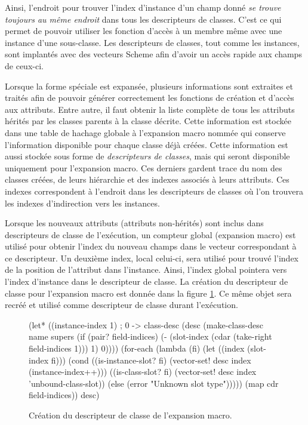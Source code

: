 \documentclass[12pt,oneside,letterpaper,francais]{book}
\newcommand{\scheme}[1]{\selectlanguage{english}{\tt #1}\selectlanguage{french}}
\begin{document}
Ainsi, l'endroit pour trouver l'index d'instance d'un champ donné
\emph{se trouve toujours au même endroit} dans tous les descripteurs
de classes. C'est ce qui permet de pouvoir utiliser les fonction
d'accès à un membre même avec une instance d'une sous-classe. Les
descripteurs de classes, tout comme les instances, sont implantés avec
des vecteurs Scheme afin d'avoir un accès rapide aux champs de ceux-ci.

Lorsque la forme spéciale \scheme{define-class} est expansée,
plusieurs informations sont extraites et traités afin de pouvoir
générer correctement les fonctions de création et d'accès aux
attributs. Entre autre, il faut obtenir la liste complète de tous les
attributs hérités par les classes parents à la classe décrite. Cette
information est stockée dans une table de hachage globale à
l'expansion macro nommée \scheme{mt-class-table} qui conserve
l'information disponible pour chaque classe déjà créées. Cette
information est aussi stockée sous forme de \emph{descripteurs de
  classes}, mais qui seront disponible uniquement pour l'expansion
macro. Ces derniers gardent trace du nom des classes créées, de leurs
hiérarchie et des indexes associés à leurs attributs. Ces indexes
correspondent à l'endroit dans les descripteurs de classes où l'on
trouvera les indexes d'indirection vers les instances.

Lorsque les nouveaux attributs (attributs non-hérités) sont inclus
dans descripteurs de classe de l'exécution, un compteur global
(expansion macro) est utilisé pour obtenir l'index du nouveau champs
dans le vecteur correspondant à ce descripteur. Un deuxième index,
local celui-ci, sera utilisé pour trouvé l'index de la position de
l'attribut dans l'instance. Ainsi, l'index global pointera vers
l'index d'instance dans le descripteur de classe. La création du
descripteur de classe pour l'expansion macro est donnée dans la figure
\ref{OO:classdesc-code}. Ce même objet sera recréé et utilisé comme
descripteur de classe durant l'exécution.

\begin{figure}[htb!]
  \begin{schemecode}
(let* ((instance-index 1) ; 0 -> class-desc
       (desc (make-class-desc
              name supers
              (if (pair? field-indices)
                  (- (slot-index
                      (cdar (take-right field-indices 1)))
                     1)
                  0))))
  (for-each
   (lambda (fi)
     (let ((index (slot-index fi)))
       (cond ((is-instance-slot? fi)
              (vector-set! desc index (instance-index++)))
             ((is-class-slot? fi)
              (vector-set! desc index 'unbound-class-slot))
             (else
              (error "Unknown slot type")))))
   (map cdr field-indices))
  desc)
  \end{schemecode}
  \caption{Création du descripteur de classe de l'expansion macro.}
  \label{OO:classdesc-code}
\end{figure}
\end{document}
